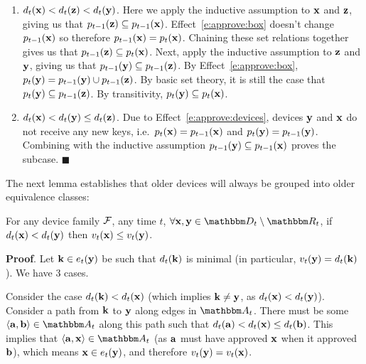\begin{enumerate}
\begin{enumerate}
  \item $d_t(\mathbf{x}) < d_t(\mathbf{z}) < d_t(\mathbf{y})$. Here we apply the
    inductive assumption to $\mathbf{x}$ and $\mathbf{z}$, giving us that $p_{t-1}(\mathbf{z})
    \subseteq p_{t-1}(\mathbf{x})$. Effect~\ref{e:approve:box} doesn't change
    $p_{t-1}(\mathbf{x})$ so therefore $p_{t-1}(\mathbf{x}) = p_{t}(\mathbf{x})$. Chaining
    these set relations together gives us that $p_{t-1}(\mathbf{z}) \subseteq
    p_{t}(\mathbf{x})$. Next, apply the inductive assumption to $\mathbf{z}$ and $\mathbf{y}$, giving
    us that $p_{t-1}(\mathbf{y}) \subseteq p_{t-1}(\mathbf{z})$. By
    Effect~\ref{e:approve:box}, $p_{t}(\mathbf{y}) = p_{t-1}(\mathbf{y}) \cup
    p_{t-1}(\mathbf{z})$. By basic set theory, it is still the case that $p_{t}(\mathbf{y})
    \subseteq p_{t-1}(\mathbf{z})$. By transitivity, $p_{t}(\mathbf{y}) \subseteq
    p_{t}(\mathbf{x})$.

  \item $d_t(\mathbf{x}) < d_t(\mathbf{y}) \leq d_t(\mathbf{z})$. Due to
    Effect~\ref{e:approve:devices}, devices $\mathbf{y}$ and $\mathbf{x}$ do not receive any new keys,
    i.e.\ $p_{t}(\mathbf{x}) = p_{t-1}(\mathbf{x})$ and $p_{t}(\mathbf{y}) =
    p_{t-1}(\mathbf{y})$. Combining with the inductive assumption $p_{t-1}(\mathbf{y})
    \subseteq p_{t-1}(\mathbf{x})$ proves the subcase. $\blacksquare$
  \end{enumerate}
\end{enumerate}

The next lemma establishes that older devices will always be grouped into older equivalence classes:

\begin{lemma}
  For any device family $\mathcal{F}$, any time $t$, $\forall \zdev{x},\zdev{y} \in \zset{d}_t \setminus
  \zset{R}_t$, if $d_t(\mathbf{x}) < d_t(\mathbf{y})$ then $v_t(\mathbf{x}) \le
  v_t(\mathbf{y})$.
  \label{l:verif_ineq}
\end{lemma}

\textbf{Proof}. Let $\mathbf{k} \in e_t(\mathbf{y})$ be such that $d_{t}(\mathbf{k})$ is minimal (in
particular, $v_{t}(\mathbf{y}) = d_{t}(\mathbf{k})$). We have 3 cases.

Consider the case $d_{t}(\mathbf{k}) < d_{t}(\mathbf{x})$ (which implies $\mathbf{k} \neq \mathbf{y}$, as
$d_{t}(\mathbf{x}) < d_{t}(\mathbf{y})$). Consider a path from $\mathbf{k}$ to $\mathbf{y}$ along edges in
$\zset{a}_t$. There must be some $\langle \zdev{a}, \zdev{b} \rangle \in \zset{a}_t$ along this path
such that $d_{t}(\mathbf{a}) < d_{t}(\mathbf{x}) \le d_{t}(\mathbf{b})$. This implies that $\langle
\zdev{a}, \zdev{x} \rangle \in \zset{a}_t$ (as $\mathbf{a}$ must have approved $\mathbf{x}$ when it
approved $\mathbf{b}$), which means $\mathbf{x} \in e_t(\mathbf{y})$, and therefore $v_{t}(\mathbf{y}) =
v_{t}(\mathbf{x})$.

